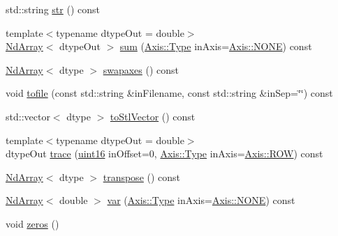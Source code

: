 \begin{DoxyCompactItemize}
std\+::string \mbox{\hyperlink{class_num_c_1_1_nd_array_a405e8c1f1acb2abb77c0d505be554cea}{str}} () const
\item 
{\footnotesize template$<$typename dtype\+Out  = double$>$ }\\\mbox{\hyperlink{class_num_c_1_1_nd_array}{Nd\+Array}}$<$ dtype\+Out $>$ \mbox{\hyperlink{class_num_c_1_1_nd_array_a6424afd8a7039fc8f42a1e0c45e73b77}{sum}} (\mbox{\hyperlink{struct_num_c_1_1_axis_a8e689044ef1941a03482e730c5e7ebb3}{Axis\+::\+Type}} in\+Axis=\mbox{\hyperlink{struct_num_c_1_1_axis_a8e689044ef1941a03482e730c5e7ebb3a0ae033c4226f7184bf0050b101e7ed94}{Axis\+::\+N\+O\+NE}}) const
\item 
\mbox{\hyperlink{class_num_c_1_1_nd_array}{Nd\+Array}}$<$ dtype $>$ \mbox{\hyperlink{class_num_c_1_1_nd_array_afe86fdb5637da58ba7630ff9051cafd2}{swapaxes}} () const
\item 
void \mbox{\hyperlink{class_num_c_1_1_nd_array_a54684e5ea7f13318a45e06002bb8ca26}{tofile}} (const std\+::string \&in\+Filename, const std\+::string \&in\+Sep=\char`\"{}\char`\"{}) const
\item 
std\+::vector$<$ dtype $>$ \mbox{\hyperlink{class_num_c_1_1_nd_array_a6c0fc5c26b9d536c8cbb2c344fb32125}{to\+Stl\+Vector}} () const
\item 
{\footnotesize template$<$typename dtype\+Out  = double$>$ }\\dtype\+Out \mbox{\hyperlink{class_num_c_1_1_nd_array_a23fa05a861a45be62bb4c7650ecebcb3}{trace}} (\mbox{\hyperlink{namespace_num_c_a870ab72deafe3efd4eb63e6a2e63a236}{uint16}} in\+Offset=0, \mbox{\hyperlink{struct_num_c_1_1_axis_a8e689044ef1941a03482e730c5e7ebb3}{Axis\+::\+Type}} in\+Axis=\mbox{\hyperlink{struct_num_c_1_1_axis_a8e689044ef1941a03482e730c5e7ebb3a392f74a34b6718b6d219cb2a08894feb}{Axis\+::\+R\+OW}}) const
\item 
\mbox{\hyperlink{class_num_c_1_1_nd_array}{Nd\+Array}}$<$ dtype $>$ \mbox{\hyperlink{class_num_c_1_1_nd_array_a3a6a59611e0138b624030d30f362f8ac}{transpose}} () const
\item 
\mbox{\hyperlink{class_num_c_1_1_nd_array}{Nd\+Array}}$<$ double $>$ \mbox{\hyperlink{class_num_c_1_1_nd_array_a5b56db8e1e80782412cee85c277ca614}{var}} (\mbox{\hyperlink{struct_num_c_1_1_axis_a8e689044ef1941a03482e730c5e7ebb3}{Axis\+::\+Type}} in\+Axis=\mbox{\hyperlink{struct_num_c_1_1_axis_a8e689044ef1941a03482e730c5e7ebb3a0ae033c4226f7184bf0050b101e7ed94}{Axis\+::\+N\+O\+NE}}) const
\item 
void \mbox{\hyperlink{class_num_c_1_1_nd_array_ac5a6ca9e5aed16a5dc6ea3965f96124c}{zeros}} ()
\end{DoxyCompactItemize}
